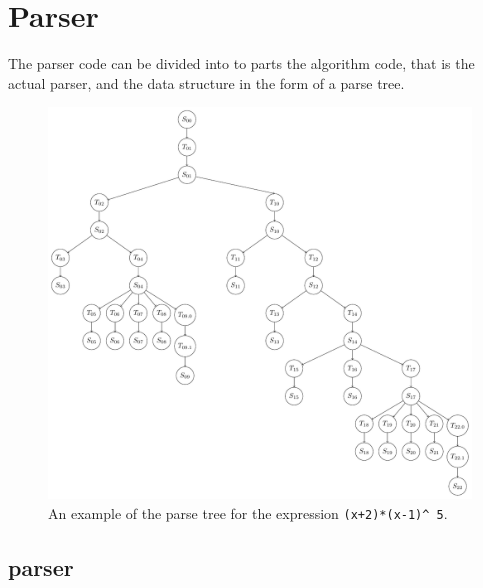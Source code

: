 \documentclass[a4paper,11pt]{kth-mag}
\begin{document}
\section{Parser}
The parser code can be divided into to parts the algorithm code, that is the 
actual parser, and the data structure in the form of a parse tree.

\begin{figure}[ht]
\begin{center}
    \includegraphics[width=\textwidth]{parse-tree.pdf}
    \caption{\small{
        An example of the parse tree for the
        expression \texttt{(x+2)*(x-1)}\texttt{\^~}\!\!\texttt{5}.
    }}
   \label{fig:parsetree}
\end{center}
\end{figure}




\subsection{parser}
\end{document}
